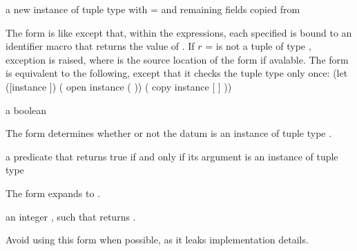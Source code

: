 \begin{syntax}
\end{syntax}
\returns{} a new instance of tuple type  with  =
 \etc{} and remaining fields copied from 

The  form is like  except that, within the  expressions,
each specified  is bound to an identifier macro that returns the value of .
If $r$ =  is not a tuple of type , exception
 is raised, where
 is the source location of the  form if avalable.
The  form is equivalent to the following, except that it
checks the tuple type only once:
\antipar\codebegin
(let ([instance ])
  ( open instance ( \etc{}))
  ( copy instance [ ] \etc{}))
\codeend\antipar

\begin{syntax}
\end{syntax}
\returns{} a boolean

The  form determines whether or not the datum  is
an instance of tuple type .

\begin{syntax}
\end{syntax}
\expandsto{} a predicate that returns true if and only if its argument
is an instance of tuple type 

The  form expands to .

\begin{syntax}
\end{syntax}
\expandsto{} an integer , such that 
returns .

Avoid using this form when possible, as it leaks implementation details.

